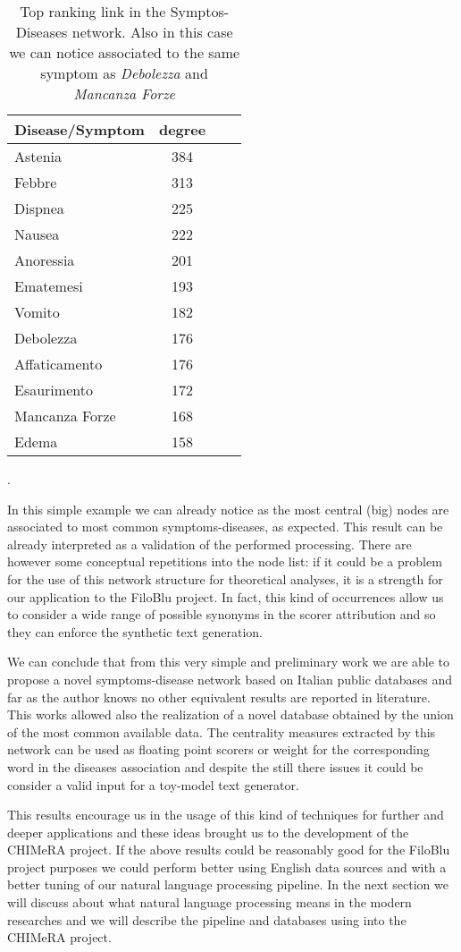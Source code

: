 \documentclass{standalone}
\begin{document}
\begin{table}[htbp]
\centering
\begin{tabular}{lccc}
\hline \rowcolor{darkgrayrow}
Disease/Symptom & degree \\
\hline
Astenia         & 384    \\
Febbre          & 313    \\
Dispnea         & 225    \\
Nausea          & 222    \\
Anoressia       & 201    \\
Ematemesi       & 193    \\
Vomito          & 182    \\
Debolezza       & 176    \\
Affaticamento   & 176    \\
Esaurimento     & 172    \\
Mancanza Forze  & 168    \\
Edema           & 158    \\
\hline
\end{tabular}
\caption{Top ranking link in the Symptos-Diseases network. Also in this case we can notice  associated to the same symptom as \emph{Debolezza} and \emph{Mancanza Forze}}.
\label{tab:rank}
\end{table}

In this simple example we can already notice as the most central (big) nodes are associated to most common symptoms-diseases, as expected.
This result can be already interpreted as a validation of the performed processing.
There are however some conceptual repetitions into the node list: if it could be a problem for the use of this network structure for theoretical analyses, it is a strength for our application to the FiloBlu project.
In fact, this kind of occurrences allow us to consider a wide range of possible synonyms in the scorer attribution and so they can enforce the synthetic text generation.

We can conclude that from this very simple and preliminary work we are able to propose a novel symptoms-disease network based on Italian public databases and far as the author knows no other equivalent results are reported in literature.
This works allowed also the realization of a novel database obtained by the union of the most common available data.
The centrality measures extracted by this network can be used as floating point scorers or weight for the corresponding word
in the diseases association and despite the still there issues it could be consider a valid input for a toy-model text generator.

This results encourage us in the usage of this kind of techniques for further and deeper applications and these ideas brought us to the development of the \textsf{CHIMeRA} project.
If the above results could be reasonably good for the FiloBlu project purposes we could perform better using English data sources and with a better tuning of our natural language processing pipeline.
In the next section we will discuss about what natural language processing means in the modern researches and we will describe the pipeline and databases using into the \textsf{CHIMeRA} project.
\end{document}
